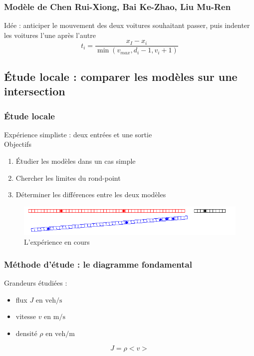 \documentclass[slidetop,11pt]{beamer}
\begin{document}
	
\begin{frame}
	\frametitle{Modèle de Chen Rui-Xiong, Bai Ke-Zhao, Liu Mu-Ren}
	Idée : anticiper le mouvement des deux voitures souhaitant passer, puis indenter les voitures l'une après l'autre
		\begin{equation}
			t_i = \frac{x_I - x_i}{\min(v_{max},d_i-1,v_i+1)}
		\end{equation}
\end{frame}
	\subsection{Étude locale : comparer les modèles sur une intersection}

\begin{frame}
	\frametitle{Étude locale}
	Expérience simpliste : deux entrées et une sortie \\
	Objectifs
	\begin{enumerate}
		\item Étudier les modèles dans un cas simple
	 	\item Chercher les limites du rond-point
		\item Déterminer les différences entre les deux modèles
	\end{enumerate}
	\begin{figure}
		\begin{center}
			\includegraphics[scale=0.5]{./images/localdebut}	
		\end{center}
		\caption{L'expérience en cours}
	\end{figure}		
\end{frame}	

\begin{frame}
	\frametitle{Méthode d'étude : le diagramme fondamental}
	Grandeurs étudiées : 
	\begin{itemize}
		\item flux $J \text{ en } \mathrm{veh}/\mathrm{s}$
		\item vitesse $v \text{ en } \mathrm{m}/\mathrm{s}$
		\item densité $\rho \text{ en } \mathrm{veh}/\mathrm{m}$
	\end{itemize}
	$$J = \rho<v>$$
\end{frame}
\end{document}
